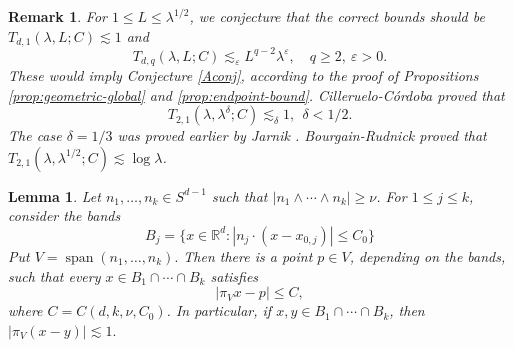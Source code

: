 \documentclass[11pt,reqno]{amsart}
\newtheorem{lemma}[theorem]{Lemma}
\newtheorem{remark}[theorem]{Remark}
\numberwithin{equation}{section}
\newcommand{\1}{\textbf{1}}
\newcommand{\ls}{\lesssim}
\newcommand{\R}{\mathbb R}
\newcommand{\eps}{\varepsilon}
\newcommand{\la}{\lambda}
\DeclareMathOperator{\spanop}{span}
\begin{document}
	\begin{remark}{\rm For $1\le L\le \la^{1/2}$, we conjecture that the correct bounds should be $T_{d,1}(\la,L;C)\ls 1$ and $$T_{d,q}(\la,L;C)\ls_\eps L^{q-2}\la^\eps,\quad q\ge2,\ \eps>0.$$ These would imply Conjecture \ref{Aconj}, according to the proof of Propositions \ref{prop:geometric-global} and \ref{prop:endpoint-bound}. Cilleruelo-C\'ordoba \cite{CC1992} proved that $$T_{2,1}(\la,\la^\delta;C)\ls_\delta 1,\ \ \delta<1/2.$$ The case $\delta=1/3$ was proved earlier by Jarnik \cite{Jar1926}. Bourgain-Rudnick \cite[Lemma 2.1]{BR2015} proved that $T_{2,1}(\la,\la^{1/2};C)\ls \log\la$. }
		
	\end{remark}
	
	\begin{lemma}\label{lem:transverse-slab}
		Let \(n_1,\ldots,n_k\in S^{d-1}\) such that
		\(|n_1\wedge\cdots\wedge n_k|\ge\nu\). For \(1\le j\le k\), consider the bands
		\[
		B_j=\{x\in\R^d: |n_j\cdot(x-x_{0,j})|\le C_0\}
		\]
		Put
		\(
		V=\spanop(n_1,\ldots,n_k).
		\)
		Then there is a point \(p\in V\), depending on the bands, such that every
		\(x\in B_1\cap\cdots\cap B_k\) satisfies
		\[
		|\pi_Vx-p|\le C,
		\]
		where \(C=C(d,k,\nu,C_0)\).  In particular, if
		\(x,y\in B_1\cap\cdots\cap B_k\), then $	|\pi_V(x-y)|\ls 1.$
	\end{lemma}
	
\end{document}
